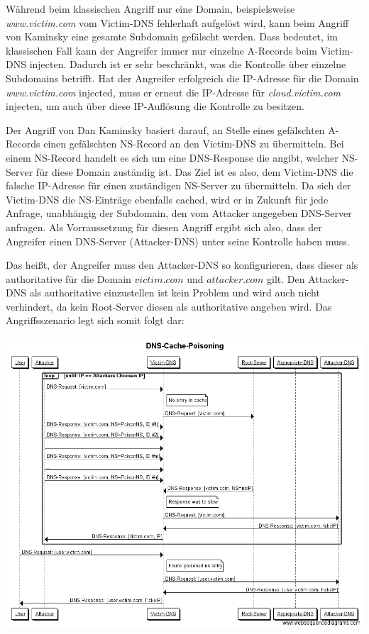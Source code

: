 \documentclass[10pt,a4paper]{article}
\begin{document}
Während beim klassischen Angriff nur eine Domain, beispielsweise \emph{www.victim.com} vom Victim-DNS fehlerhaft aufgelöst wird, kann beim Angriff von Kaminsky eine gesamte Subdomain gefälscht werden. Dass bedeutet, im klassischen Fall kann der Angreifer immer nur einzelne A-Records beim Victim-DNS \glqq injecten\grqq. Dadurch ist er sehr beschränkt, was die Kontrolle über einzelne Subdomains betrifft. Hat der Angreifer erfolgreich die IP-Adresse für die Domain \emph{www.victim.com} \glqq injected\grqq, muss er erneut die IP-Adresse für \emph{cloud.victim.com}  \glqq injecten\grqq, um auch über diese IP-Auflösung die Kontrolle zu besitzen. 

Der Angriff von Dan Kaminsky basiert darauf, an Stelle eines gefälschten A-Records einen gefälschten NS-Record an den Victim-DNS zu übermitteln. Bei einem NS-Record handelt es sich um eine DNS-Response die angibt, welcher NS-Server für diese Domain zuständig ist. Das Ziel ist es also, dem Victim-DNS die falsche IP-Adresse für einen zuständigen NS-Server zu übermitteln. Da sich der Victim-DNS die NS-Einträge ebenfalls cached, wird er in Zukunft für jede Anfrage, unabhängig der Subdomain, den vom Attacker angegeben DNS-Server anfragen. Als Vorraussetzung für diesen Angriff ergibt sich also, dass der Angreifer einen DNS-Server (Attacker-DNS) unter seine Kontrolle haben muss. 

Das heißt, der Angreifer muss den Attacker-DNS so konfigurieren, dass dieser als authoritative für die Domain $victim.com$ und $attacker.com$ gilt. Den Attacker-DNS als authoritative einzustellen ist kein Problem und wird auch nicht verhindert, da kein Root-Server diesen als authoritative angeben wird. Das Angriffsszenario legt sich somit folgt dar:

{
\centering
\includegraphics[scale=0.35]{DNS-Cache-Poisoning.png}
}
\end{document}

